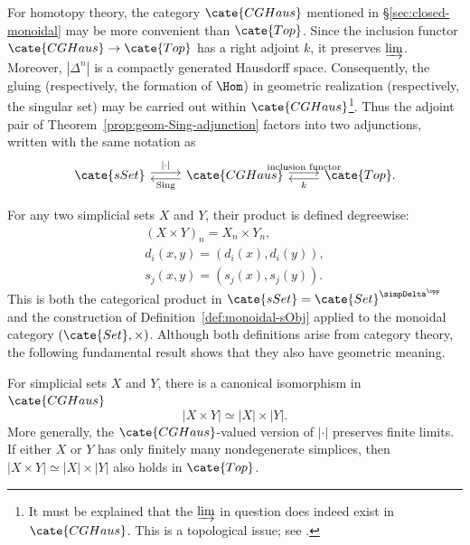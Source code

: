 \begin{remark}
	For homotopy theory, the category $\cate{CGHaus}$ mentioned in
	\S\ref{sec:closed-monoidal} may be more convenient than $\cate{Top}$.
	Since the inclusion functor $\cate{CGHaus}\to\cate{Top}$ has a right
	adjoint $k$, it preserves $\varinjlim$. Moreover, $|\Delta^n|$ is a
	compactly generated Hausdorff space. Consequently, the gluing
	(respectively, the formation of $\Hom$) in geometric realization
	(respectively, the singular set) may be carried out within
	$\cate{CGHaus}$\footnote{It must be explained that the $\varinjlim$ in
	question does indeed exist in $\cate{CGHaus}$. This is a topological issue;
	see \cite[III.1.8, III.2.1]{GZ67}.}. Thus the adjoint pair of
	Theorem~\ref{prop:geom-Sing-adjunction} factors into two adjunctions, written
	with the same notation as
	\[\begin{tikzcd}
		\cate{sSet} \arrow[shift left, r, "{|\cdot|}"] & \cate{CGHaus} \arrow[shift left, r, "\text{inclusion functor}"] \arrow[shift left, l, "\mathrm{Sing}"] & \cate{Top} \arrow[shift left, l, "k"] .
	\end{tikzcd}\]
\end{remark}
For any two simplicial sets $X$ and $Y$, their product is defined degreewise:
\begin{gather*}
	(X \times Y)_n = X_n \times Y_n, \\
	d_i(x, y) = (d_i(x), d_i(y)), \\
	s_j(x, y) = (s_j(x), s_j(y)).
\end{gather*}
This is both the categorical product in
$\cate{sSet}=\cate{Set}^{\simpDelta^{\opp}}$ and the construction of
Definition~\ref{def:monoidal-sObj} applied to the monoidal category
$(\cate{Set},\times)$. Although both definitions arise from category theory,
the following fundamental result shows that they also have geometric meaning.

\begin{theorem}\label{prop:realization-product}
	For simplicial sets $X$ and $Y$, there is a canonical isomorphism in
	$\cate{CGHaus}$
	\[ |X \times Y| \simeq |X| \times |Y|. \]
	More generally, the $\cate{CGHaus}$-valued version of $|\cdot|$ preserves
	finite limits. If either $X$ or $Y$ has only finitely many nondegenerate
	simplices, then $|X\times Y|\simeq|X|\times|Y|$ also holds in
	$\cate{Top}$.
\end{theorem}

